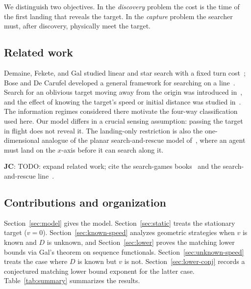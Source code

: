 \documentclass[runningheads,envcountsame,envcountsect]{llncs}
\newcommand\JC[1]{{\color{Maroon} \textbf{JC}: #1}}
\begin{document}
We distinguish two objectives. In the \emph{discovery} problem the cost is the time of the first landing that reveals the target. In the \emph{capture} problem the searcher must, after discovery, physically meet the target.

\subsection{Related work}\label{sec:related}

Demaine, Fekete, and Gal studied linear and star search with a fixed turn cost~\cite{demaine2006online}; Bose and De Carufel developed a general framework for searching on a line~\cite{bose2013revisiting,bose2017general}. Search for an oblivious target moving away from the origin was introduced in~\cite{coleman2022oblivious}, and the effect of knowing the target's speed or initial distance was studied in~\cite{coleman2024escaping,coleman2026knowledge}. The information regimes considered there motivate the four-way classification used here. Our model differs in a crucial sensing assumption: passing the target in flight does not reveal it. The landing-only restriction is also the one-dimensional analogue of the planar search-and-rescue model of~\cite{coleman2026searchrescueplane}, where an agent must land on the $x$-axis before it can search along it.

\JC{TODO: expand related work; cite the search-games books~\cite{alpern2003theory,gal1980} and the search-and-rescue line~\cite{coleman2023sar}.}

\subsection{Contributions and organization}

Section~\ref{sec:model} gives the model. Section~\ref{sec:static} treats the stationary target ($v = 0$). Section~\ref{sec:known-speed} analyzes geometric strategies when $v$ is known and $D$ is unknown, and Section~\ref{sec:lower} proves the matching lower bounds via Gal's theorem on sequence functionals. Section~\ref{sec:unknown-speed} treats the case where $D$ is known but $v$ is not. Section~\ref{sec:lower-conj} records a conjectured matching lower bound exponent for the latter case. Table~\ref{tab:summary} summarizes the results.
\end{document}
